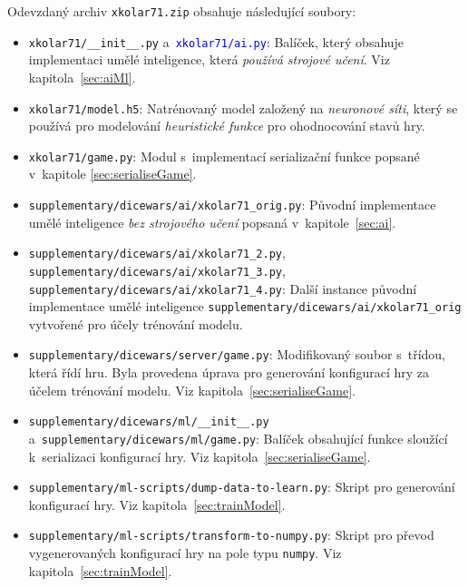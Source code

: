 \documentclass[11pt, a4paper]{article}
\theoremstyle{definition}
\begin{document}
Odevzdaný archiv \texttt{xkolar71.zip} obsahuje následující soubory:
\begin{itemize}
    \item
        \texttt{xkolar71/\_\_init\_\_.py}
        a~\textcolor{blue}{\texttt{xkolar71/ai.py}}: Balíček,
        který obsahuje implementaci umělé inteligence, která \emph{používá
        strojové učení}. Viz kapitola~\ref{sec:aiMl}.

    \item
        \texttt{xkolar71/model.h5}: Natrénovaný model založený
        na \emph{neuronové síti}, který se používá pro modelování
        \emph{heuristické funkce} pro ohodnocování stavů hry.


    \item
        \texttt{xkolar71/game.py}: Modul s~implementací serializační
        funkce popsané v~kapitole \ref{sec:serialiseGame}.

    \item
        \texttt{supplementary/dicewars/ai/xkolar71\_orig.py}: Původní
        implementace umělé inteligence \emph{bez strojového učení} popsaná
        v~kapitole~\ref{sec:ai}.

    \item
        \texttt{supplementary/dicewars/ai/xkolar71\_2.py},
        \texttt{supplementary/dicewars/ai/xkolar71\_3.py}, \\
        \texttt{supplementary/dicewars/ai/xkolar71\_4.py}:
        Další instance původní implementace umělé inteligence
        \texttt{supplementary/dicewars/ai/xkolar71\_orig} vytvořené pro
        účely trénování modelu.

    \item
        \texttt{supplementary/dicewars/server/game.py}: Modifikovaný soubor
        s~třídou, která řídí hru. Byla provedena úprava pro generování
        konfigurací hry za účelem trénování modelu. Viz
        kapitola~\ref{sec:serialiseGame}.

    \item
        \texttt{supplementary/dicewars/ml/\_\_init\_\_.py}
        a~\texttt{supplementary/dicewars/ml/game.py}: Balíček obsahující funkce
        sloužící k~serializaci konfigurací hry. Viz
        kapitola~\ref{sec:serialiseGame}.

    \item
        \texttt{supplementary/ml-scripts/dump-data-to-learn.py}: Skript pro
        generování konfigurací hry. Viz kapitola~\ref{sec:trainModel}.

    \item
        \texttt{supplementary/ml-scripts/transform-to-numpy.py}: Skript pro
        převod vygenerovaných konfigurací hry na pole typu \texttt{numpy}. Viz
        kapitola~\ref{sec:trainModel}.


\end{itemize}
\end{document}
